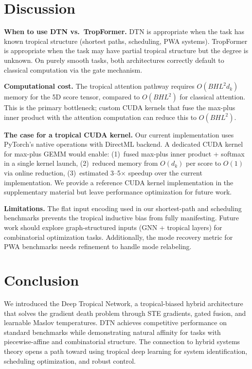 \documentclass[11pt,twocolumn]{article}
\begin{document}
\section{Discussion}\label{sec:discussion}

\textbf{When to use DTN vs.\ TropFormer.}
DTN is appropriate when the task has known tropical structure (shortest
paths, scheduling, PWA systems). TropFormer is appropriate when the task
may have partial tropical structure but the degree is unknown. On purely
smooth tasks, both architectures correctly default to classical computation
via the gate mechanism.

\textbf{Computational cost.}
The tropical attention pathway requires $O(BHL^2d_k)$ memory for the 5D
score tensor, compared to $O(BHL^2)$ for classical attention. This is the
primary bottleneck; custom CUDA kernels that fuse the max-plus inner product
with the attention computation can reduce this to $O(BHL^2)$.

\textbf{The case for a tropical CUDA kernel.}
Our current implementation uses PyTorch's native operations with DirectML
backend. A dedicated CUDA kernel for max-plus GEMM would enable:
(1)~fused max-plus inner product + softmax in a single kernel launch,
(2)~reduced memory from $O(d_k)$ per score to $O(1)$ via online reduction,
(3)~estimated 3--5$\times$ speedup over the current implementation.
We provide a reference CUDA kernel implementation in the supplementary
material but leave performance optimization for future work.

\textbf{Limitations.}
The flat input encoding used in our shortest-path and scheduling benchmarks
prevents the tropical inductive bias from fully manifesting. Future work
should explore graph-structured inputs (GNN + tropical layers) for
combinatorial optimization tasks. Additionally, the mode recovery metric
for PWA benchmarks needs refinement to handle mode relabeling.

\section{Conclusion}\label{sec:conclusion}

We introduced the Deep Tropical Network, a tropical-biased hybrid
architecture that solves the gradient death problem through STE gradients,
gated fusion, and learnable Maslov temperatures. DTN achieves competitive
performance on standard benchmarks while demonstrating natural affinity for
tasks with piecewise-affine and combinatorial structure. The connection to
hybrid systems theory opens a path toward using tropical deep learning for
system identification, scheduling optimization, and robust control.
\end{document}
